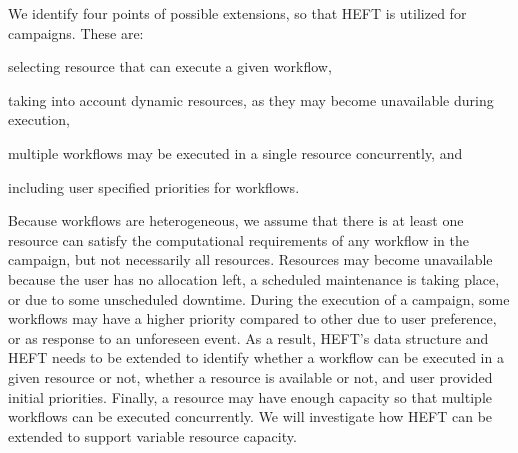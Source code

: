 We identify four points of possible extensions, so that HEFT is utilized for campaigns.
These are:
\begin{inparaenum}[(i)]
    \item selecting resource that can execute a given workflow,
    \item taking into account dynamic resources, as they may become unavailable during execution,
    \item multiple workflows may be executed in a single resource concurrently, and
    \item including user specified priorities for workflows.
\end{inparaenum}
Because workflows are heterogeneous, we assume that there is at least one resource can satisfy the computational requirements of any workflow in the campaign, but not necessarily all resources.
Resources may become unavailable because the user has no allocation left, a scheduled maintenance is taking place, or due to some unscheduled downtime.
During the execution of a campaign, some workflows may have a higher priority compared to other due to user preference, or as response to an unforeseen event.
As a result, HEFT's data structure and HEFT needs to be extended to identify whether a workflow can be executed in a given resource or not, whether a resource is available or not, and user provided initial priorities.
Finally, a resource may have enough capacity so that multiple workflows can be executed concurrently.
We will investigate how HEFT can be extended to support variable resource capacity.

